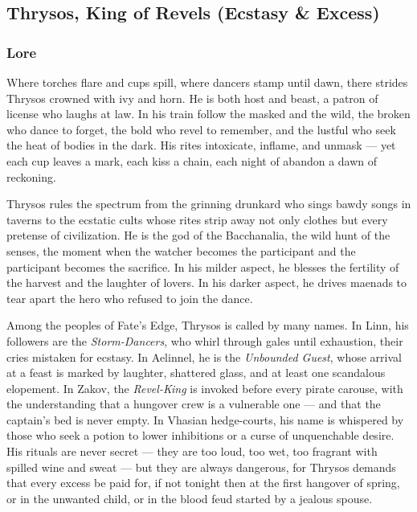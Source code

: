 
\subsection{Thrysos, King of Revels (Ecstasy \& Excess)}

\subsubsection*{Lore}
Where torches flare and cups spill, where dancers stamp until dawn, there strides Thrysos crowned with ivy and horn. He is both host and beast, a patron of license who laughs at law. In his train follow the masked and the wild, the broken who dance to forget, the bold who revel to remember, and the lustful who seek the heat of bodies in the dark. His rites intoxicate, inflame, and unmask --- yet each cup leaves a mark, each kiss a chain, each night of abandon a dawn of reckoning.

Thrysos rules the spectrum from the grinning drunkard who sings bawdy songs in taverns to the ecstatic cults whose rites strip away not only clothes but every pretense of civilization. He is the god of the Bacchanalia, the wild hunt of the senses, the moment when the watcher becomes the participant and the participant becomes the sacrifice. In his milder aspect, he blesses the fertility of the harvest and the laughter of lovers. In his darker aspect, he drives maenads to tear apart the hero who refused to join the dance.

Among the peoples of Fate's Edge, Thrysos is called by many names. In Linn, his followers are the \textit{Storm-Dancers}, who whirl through gales until exhaustion, their cries mistaken for ecstasy. In Aelinnel, he is the \textit{Unbounded Guest}, whose arrival at a feast is marked by laughter, shattered glass, and at least one scandalous elopement. In Zakov, the \textit{Revel-King} is invoked before every pirate carouse, with the understanding that a hungover crew is a vulnerable one --- and that the captain's bed is never empty. In Vhasian hedge-courts, his name is whispered by those who seek a potion to lower inhibitions or a curse of unquenchable desire. His rituals are never secret --- they are too loud, too wet, too fragrant with spilled wine and sweat --- but they are always dangerous, for Thrysos demands that every excess be paid for, if not tonight then at the first hangover of spring, or in the unwanted child, or in the blood feud started by a jealous spouse.

